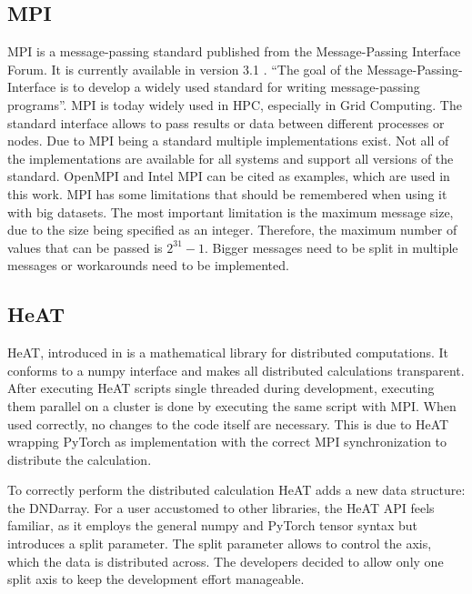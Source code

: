 \subsection{MPI}
\label{subec:mpi}
\gls{MPI} is a message-passing standard published from the Message-Passing Interface Forum. It is currently available in version 3.1 \cite{message_passing_interface_forum_mpi_2015}.
\enquote{The goal of the Message-Passing-Interface \textelp{} is to develop a widely used standard for writing message-passing programs}\cite{message_passing_interface_forum_mpi_2015}.
\gls{MPI} is today widely used in \gls{HPC}, especially in Grid Computing. The standard interface allows to pass results or data between different processes or nodes.
Due to \gls{MPI} being a standard multiple implementations exist. Not all of the implementations are available for all systems and support all versions of the standard.
OpenMPI \cite{noauthor_open_nodate} and Intel MPI \cite{noauthor_intel_nodate} can be cited as examples, which are used in this work.
\gls{MPI} has some limitations that should be remembered when using it with big datasets. The most important limitation is the maximum message size, due to the size
being specified as an integer. Therefore, the maximum number of values that can be passed is \(2^{31} - 1\). Bigger messages need to be split in multiple messages or workarounds need to be implemented.

\subsection{HeAT}
\label{subsec:heat}
\gls{HeAT}, introduced in \cite{krajsek_helmholtz_nodate} is a mathematical library for distributed computations.
It conforms to a \gls{numpy} \cite{noauthor_numpy_nodate} interface and makes all distributed calculations transparent.
After executing \gls{HeAT} scripts single threaded during development, executing them parallel on a cluster is done by executing the same script with \gls{MPI}.
When used correctly, no changes to the code itself are necessary.
This is due to \gls{HeAT} wrapping \gls{PyTorch} as implementation with the correct \gls{MPI} synchronization to distribute the calculation.

To correctly perform the distributed calculation \gls{HeAT} adds a new data structure: the \gls{DNDarray}.
For a user accustomed to other libraries, the \gls{HeAT} API feels familiar, as it employs the general \gls{numpy} and \gls{PyTorch} tensor syntax
but introduces a split parameter.
The split parameter allows to control the axis, which the data is distributed across.
The developers decided to allow only one split axis to keep the development effort manageable.

